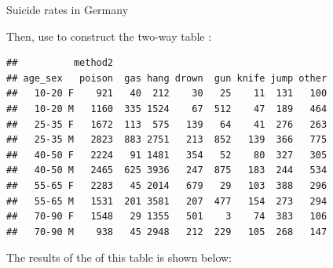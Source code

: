 \documentclass[11pt]{book}
\renewenvironment{knitrout}{\small\renewcommand{\baselinestretch}{.85}}{} %
\begin{document}
\begin{Example}[suicide1]{Suicide rates in Germany}
\begin{knitrout}
\color{fgcolor}\begin{kframe}
\begin{alltt}
\hlstd{(}\hlstd{,} \hlstd{=}\hlstd{)}
 \hlkwb{<-} 
   \hlkwb{<-}  \hlstd{(}\hlstd{,}\hlstd{)))}
        \hlstd{\})}
\end{alltt}
\end{kframe}
\end{knitrout}
Then, use  to construct the two-way table :
\begin{knitrout}
\color{fgcolor}\begin{kframe}
\begin{alltt}
 \hlkwb{<-}  \hlopt{~}  \hlopt{+}  
\end{alltt}
\begin{verbatim}
##          method2
## age_sex   poison  gas hang drown  gun knife jump other
##   10-20 F    921   40  212    30   25    11  131   100
##   10-20 M   1160  335 1524    67  512    47  189   464
##   25-35 F   1672  113  575   139   64    41  276   263
##   25-35 M   2823  883 2751   213  852   139  366   775
##   40-50 F   2224   91 1481   354   52    80  327   305
##   40-50 M   2465  625 3936   247  875   183  244   534
##   55-65 F   2283   45 2014   679   29   103  388   296
##   55-65 M   1531  201 3581   207  477   154  273   294
##   70-90 F   1548   29 1355   501    3    74  383   106
##   70-90 M    938   45 2948   212  229   105  268   147
\end{verbatim}
\end{kframe}
\end{knitrout}
The results of the \ca of this table is shown below:
\begin{knitrout}
\color{fgcolor}\begin{kframe}
\begin{alltt}
 \hlkwb{<-} 
\end{alltt}
\begin{verbatim}

\end{verbatim}
\end{kframe}
\end{knitrout}
\end{Example}
\end{document}
